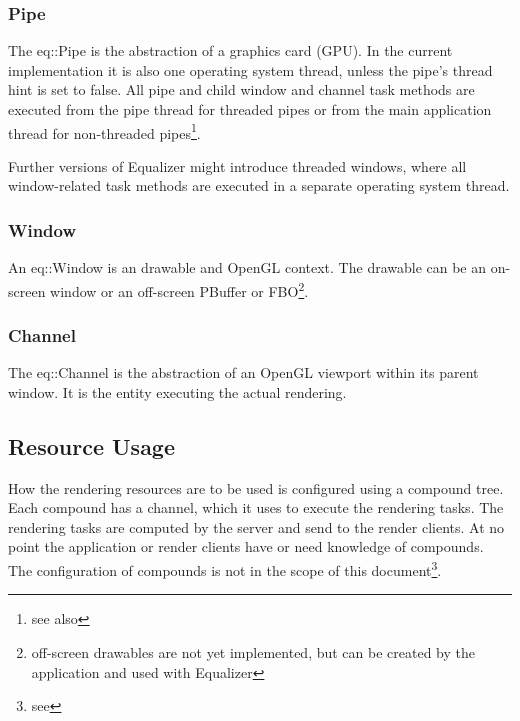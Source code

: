 \documentclass[10pt,a4]{scrartcl}
\begin{document}
\subsubsection{Pipe}

The \textsf{eq::Pipe} is the abstraction of a graphics card (GPU). In
the current implementation it is also one operating system thread,
unless the pipe's thread hint is set to \textsf{false}. All pipe and
child window and channel task methods are executed from the pipe thread
for threaded pipes or from the main application thread for non-threaded
pipes\footnote{see also
  }.

Further versions of Equalizer might introduce threaded windows, where
all window-related task methods are executed in a separate operating
system thread.

\subsubsection{Window}

An \textsf{eq::Window} is an drawable and OpenGL context. The drawable
can be an on-screen window or an off-screen PBuffer or
FBO\footnote{off-screen drawables are not yet implemented, but can be
  created by the application and used with Equalizer}. 

\subsubsection{Channel}

The \textsf{eq::Channel} is the abstraction of an OpenGL viewport within
its parent window. It is the entity executing the actual rendering.

\subsection{Resource Usage}

How the rendering resources are to be used is configured using a
compound tree. Each compound has a channel, which it uses to execute the
rendering tasks. The rendering tasks are computed by the server and send
to the render clients. At no point the application or render clients
have or need knowledge of compounds. The configuration of compounds is
not in the scope of this document\footnote{see
  }.
\end{document}
